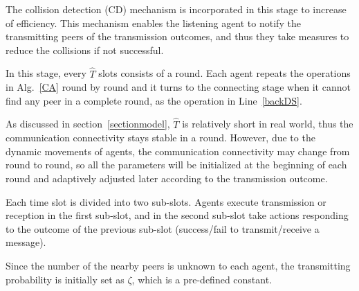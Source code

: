 The collision detection (CD) mechanism is incorporated in this stage 
to increase of efficiency. This mechanism enables the listening agent 
to notify the transmitting peers of the transmission outcomes, 
and thus they take measures to reduce the collisions if not successful.

In this stage, every $\hat{T}$ slots consists of a round. Each 
agent repeats the operations in Alg.~\ref{CA} round by round and 
it turns to the connecting stage when it cannot find any peer in a complete round, 
as the operation in Line~\ref{backDS}.

As discussed in section~\ref{sectionmodel}, $\hat{T}$ is relatively short in 
real world, thus the communication connectivity stays stable in a round. 
However, due to the dynamic movements of agents, the communication connectivity
may change from round to round, so all the parameters will be 
initialized at the beginning of each round and adaptively adjusted later 
according to the transmission outcome.

Each time slot is divided into two sub-slots.
Agents execute transmission or reception in the first sub-slot, 
and in the second sub-slot take actions responding to the outcome of the previous sub-slot
(success/fail to transmit/receive a message).

Since the number of the nearby peers is unknown to each agent, 
the transmitting probability is initially set as $\zeta$, which is a pre-defined constant.

